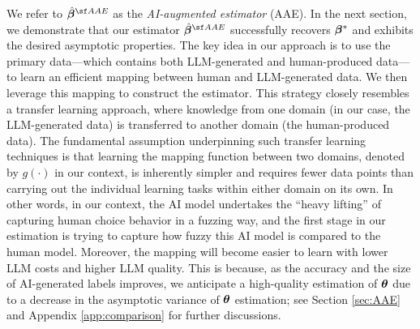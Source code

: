 We refer to $\hat{\betavec}^{\sf AAE}$ as the \textit{AI-augmented estimator} (AAE). 
In the next section, we demonstrate that our estimator $ \hat{\betavec}^{\sf AAE} $ successfully recovers $ \bm{\beta}^* $ and exhibits the desired asymptotic properties. The key idea in our approach is to use the primary data---which contains both LLM-generated and human-produced data---to learn an efficient mapping between human and LLM-generated data. We then leverage this mapping to construct the estimator. This strategy closely resembles a transfer learning approach, where knowledge from one domain (in our case, the LLM-generated data) is transferred to another domain (the human-produced data). The fundamental assumption underpinning such transfer learning techniques is that learning the mapping function between two domains, denoted by $g(\cdot)$ in our context, is inherently simpler and requires fewer data points than carrying out the individual learning tasks within either domain on its own. In other words, in our context, the AI model undertakes the ``heavy lifting'' of capturing human choice behavior in a fuzzing way, and the first stage in our estimation is trying to capture how fuzzy this AI model is compared to the human model. Moreover, the mapping will become easier to learn with lower LLM costs and higher LLM quality. This is because, as the accuracy and the size of AI-generated labels improves, we anticipate a high-quality estimation of $ \bm{\theta}$ due to a decrease in the asymptotic variance of $ \bm{\theta}$ estimation; see Section \ref{sec:AAE} and Appendix \ref{app:comparison} for further discussions.


